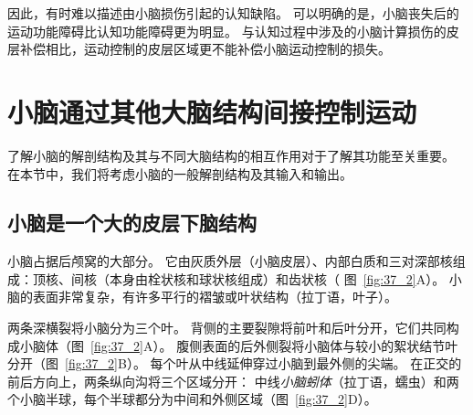 因此，有时难以描述由小脑损伤引起的认知缺陷。
可以明确的是，小脑丧失后的运动功能障碍比认知功能障碍更为明显。
与认知过程中涉及的小脑计算损伤的皮层补偿相比，运动控制的皮层区域更不能补偿小脑运动控制的损失。



\section{小脑通过其他大脑结构间接控制运动}

了解小脑的解剖结构及其与不同大脑结构的相互作用对于了解其功能至关重要。
在本节中，我们将考虑小脑的一般解剖结构及其输入和输出。


\subsection{小脑是一个大的皮层下脑结构}

小脑占据后颅窝的大部分。
它由灰质外层（小脑皮层）、内部白质和三对深部核组成：顶核、间核（本身由栓状核和球状核组成）和齿状核（ 图~\ref{fig:37_2}A）。
小脑的表面非常复杂，有许多平行的褶皱或叶状结构（拉丁语，叶子）。


两条深横裂将小脑分为三个叶。
背侧的主要裂隙将前叶和后叶分开，它们共同构成小脑体（图~\ref{fig:37_2}A）。
腹侧表面的后外侧裂将小脑体与较小的絮状结节叶分开（图~\ref{fig:37_2}B）。
每个叶从中线延伸穿过小脑到最外侧的尖端。
在正交的前后方向上，两条纵向沟将三个区域分开：
中线\textit{小脑蚓体}（拉丁语，蠕虫）和两个小脑半球，每个半球都分为中间和外侧区域（图~\ref{fig:37_2}D）。



